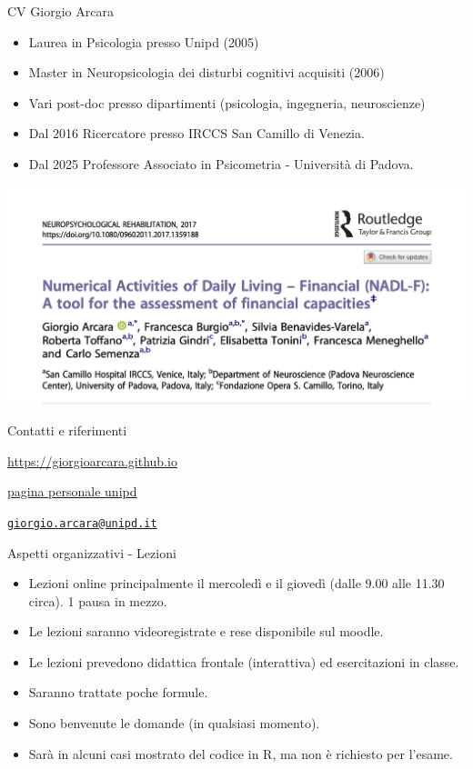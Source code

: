 \documentclass[
  ignorenonframetext,
]{beamer}
\providecommand{\tightlist}{%
  \setlength{\itemsep}{0pt}\setlength{\parskip}{0pt}}
\begin{document}
\begin{frame}{CV Giorgio Arcara}
\label{cv-giorgio-arcara}
\footnotesize

\begin{itemize}
\item
  Laurea in Psicologia presso Unipd (2005)
\item
  Master in Neuropsicologia dei disturbi cognitivi acquisiti (2006)
\item
  Vari post-doc presso dipartimenti (psicologia, ingegneria,
  neuroscienze)
\item
  Dal 2016 Ricercatore presso IRCCS San Camillo di Venezia.
\item
  Dal 2025 Professore Associato in Psicometria - Università di Padova.
\end{itemize}

\pause

\hfill
\includegraphics[width=0.6\linewidth,height=\textheight,keepaspectratio]{Figures/NADL_F.png}
\end{frame}

\begin{frame}{Contatti e riferimenti}
\label{contatti-e-riferimenti}
\centering

\href{https://giorgioarcara.github.io}{\ul{https://giorgioarcara.github.io}}

\href{https://www.dpg.unipd.it/category/ruoli/personale-docente?key=4D0707A2DD6FCCD50B90E4C9F316A625}{\ul{pagina
personale unipd}}

\href{mailto:giorgio.arcara@unipd.it}{\nolinkurl{giorgio.arcara@unipd.it}}
\end{frame}

\begin{frame}{Aspetti organizzativi - Lezioni}
\label{aspetti-organizzativi---lezioni}
\begin{itemize}
\tightlist
\item
  Lezioni online principalmente il mercoledì e il giovedì (dalle 9.00
  alle 11.30 circa). 1 pausa in mezzo.
\item
  Le lezioni saranno videoregistrate e rese disponibile sul moodle.
\item
  Le lezioni prevedono didattica frontale (interattiva) ed esercitazioni
  in classe.
\item
  Saranno trattate poche formule.
\item
  Sono benvenute le domande (in qualsiasi momento).
\item
  Sarà in alcuni casi mostrato del codice in R, ma non è richiesto per
  l'esame.
\end{itemize}
\end{frame}
\end{document}

